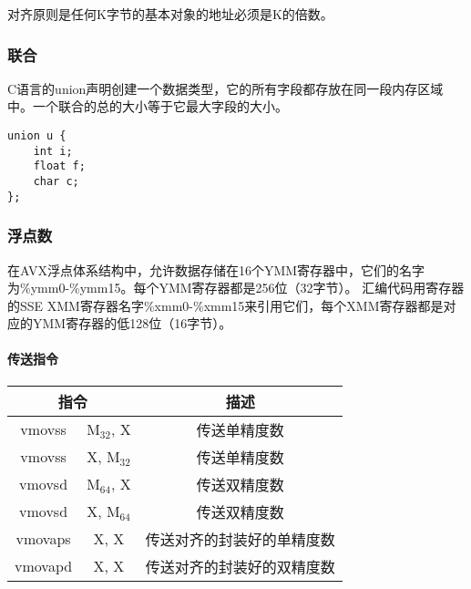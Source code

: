 对齐原则是任何K字节的基本对象的地址必须是K的倍数。

\subsubsection{联合}
C语言的union声明创建一个数据类型，它的所有字段都存放在同一段内存区域中。一个联合的总的大小等于它最大字段的大小。
\begin{lstlisting}[style=CStyle]
union u {
    int i;
    float f;
    char c;
};
\end{lstlisting}

\subsubsection{浮点数}
在AVX浮点体系结构中，允许数据存储在16个YMM寄存器中，它们的名字为\%ymm0-\%ymm15。每个YMM寄存器都是256位（32字节）。
汇编代码用寄存器的SSE XMM寄存器名字\%xmm0-\%xmm15来引用它们，每个XMM寄存器都是对应的YMM寄存器的低128位（16字节）。
\paragraph{传送指令}
\begin{table}[H]
    \centering
    \begin{tabular}{|c c|c|}
        \hline
        \multicolumn{2}{|c|}{\textbf{指令}} & \textbf{描述}                 \\
        \hline
        vmovss                            & M$_{32}$, X & 传送单精度数        \\
        \hline
        vmovss                            & X, M$_{32}$ & 传送单精度数        \\
        \hline
        vmovsd                            & M$_{64}$, X & 传送双精度数        \\
        \hline
        vmovsd                            & X, M$_{64}$ & 传送双精度数        \\
        \hline
        vmovaps                           & X, X        & 传送对齐的封装好的单精度数 \\
        \hline
        vmovapd                           & X, X        & 传送对齐的封装好的双精度数 \\
        \hline
    \end{tabular}
\end{table}

